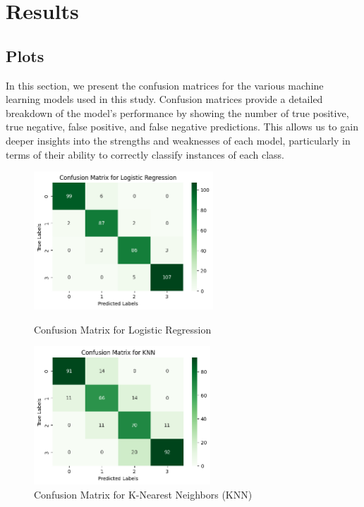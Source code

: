 \documentclass[12pt]{report}
\begin{document}
\chapter{Results}
\section{Plots}

In this section, we present the confusion matrices for the various machine learning models used in this study. Confusion matrices provide a detailed breakdown of the model's performance by showing the number of true positive, true negative, false positive, and false negative predictions. This allows us to gain deeper insights into the strengths and weaknesses of each model, particularly in terms of their ability to correctly classify instances of each class.
\begin{figure}[H]
    \centering
    \begin{minipage}{0.45\textwidth}
        \centering
        \includegraphics[height=14em]{cmat_LR.png}
        \caption{Confusion Matrix for Logistic Regression}
        \label{cmat_LR}
    \end{minipage}
    \hfill
    \begin{minipage}{0.45\textwidth}
        \centering
        \includegraphics[height=14em]{cmat_KNN.png}
        \caption{Confusion Matrix for K-Nearest Neighbors (KNN)}
        \label{cmat_KNN}
    \end{minipage}
\end{figure}
\end{document}
